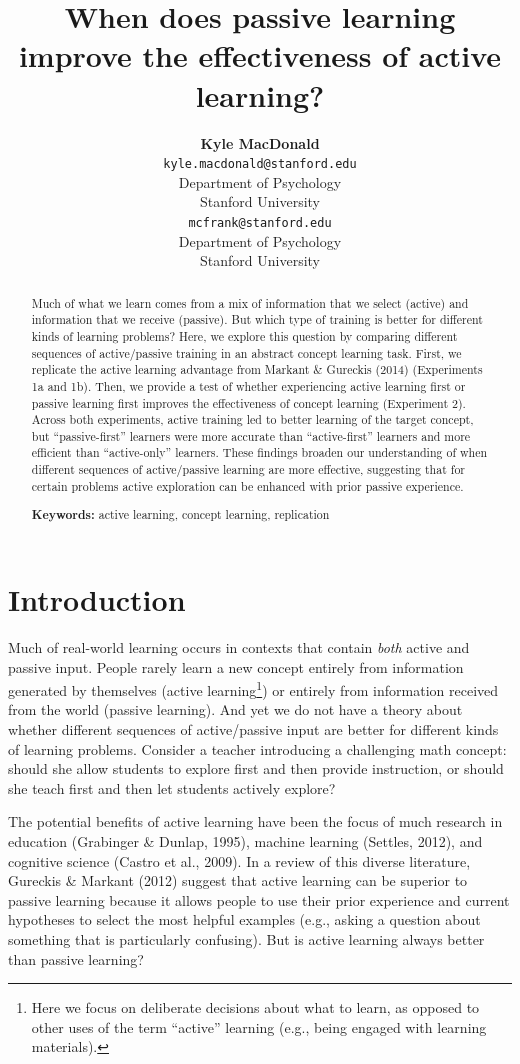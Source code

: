 \documentclass[10pt, letterpaper]{article}
\title{When does passive learning improve the effectiveness of active learning?}
\author{{\large \bf Kyle MacDonald} \\ \texttt{kyle.macdonald@stanford.edu} \\ Department of   Psychology \\ Stanford University
    \And {\large \bf Michael C. Frank} \\ \texttt{mcfrank@stanford.edu} \\ Department of Psychology \\ Stanford University}
\begin{document}
\maketitle

\begin{abstract}
Much of what we learn comes from a mix of information that we select
(active) and information that we receive (passive). But which type of
training is better for different kinds of learning problems? Here, we
explore this question by comparing different sequences of active/passive
training in an abstract concept learning task. First, we replicate the
active learning advantage from Markant \& Gureckis (2014) (Experiments
1a and 1b). Then, we provide a test of whether experiencing active
learning first or passive learning first improves the effectiveness of
concept learning (Experiment 2). Across both experiments, active
training led to better learning of the target concept, but
``passive-first'' learners were more accurate than ``active-first''
learners and more efficient than ``active-only'' learners. These
findings broaden our understanding of when different sequences of
active/passive learning are more effective, suggesting that for certain
problems active exploration can be enhanced with prior passive
experience.

\textbf{Keywords:}
active learning, concept learning, replication
\end{abstract}

\section{Introduction}\label{introduction}

Much of real-world learning occurs in contexts that contain \emph{both}
active and passive input. People rarely learn a new concept entirely
from information generated by themselves (active learning\footnote{Here
  we focus on deliberate decisions about what to learn, as opposed to
  other uses of the term ``active'' learning (e.g., being engaged with
  learning materials).}) or entirely from information received from the
world (passive learning). And yet we do not have a theory about whether
different sequences of active/passive input are better for different
kinds of learning problems. Consider a teacher introducing a challenging
math concept: should she allow students to explore first and then
provide instruction, or should she teach first and then let students
actively explore?

The potential benefits of active learning have been the focus of much
research in education (Grabinger \& Dunlap, 1995), machine learning
(Settles, 2012), and cognitive science (Castro et al., 2009). In a
review of this diverse literature, Gureckis \& Markant (2012) suggest
that active learning can be superior to passive learning because it
allows people to use their prior experience and current hypotheses to
select the most helpful examples (e.g., asking a question about
something that is particularly confusing). But is active learning always
better than passive learning?
\end{document}
